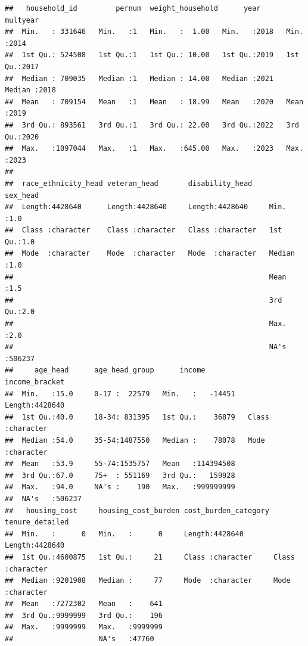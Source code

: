 \documentclass[
]{article}
\begin{document}
\begin{verbatim}
##   household_id         pernum  weight_household      year         multyear   
##  Min.   : 331646   Min.   :1   Min.   :  1.00   Min.   :2018   Min.   :2014  
##  1st Qu.: 524508   1st Qu.:1   1st Qu.: 10.00   1st Qu.:2019   1st Qu.:2017  
##  Median : 709035   Median :1   Median : 14.00   Median :2021   Median :2018  
##  Mean   : 709154   Mean   :1   Mean   : 18.99   Mean   :2020   Mean   :2019  
##  3rd Qu.: 893561   3rd Qu.:1   3rd Qu.: 22.00   3rd Qu.:2022   3rd Qu.:2020  
##  Max.   :1097044   Max.   :1   Max.   :645.00   Max.   :2023   Max.   :2023  
##                                                                              
##  race_ethnicity_head veteran_head       disability_head       sex_head     
##  Length:4428640      Length:4428640     Length:4428640     Min.   :1.0     
##  Class :character    Class :character   Class :character   1st Qu.:1.0     
##  Mode  :character    Mode  :character   Mode  :character   Median :1.0     
##                                                            Mean   :1.5     
##                                                            3rd Qu.:2.0     
##                                                            Max.   :2.0     
##                                                            NA's   :506237  
##     age_head      age_head_group      income          income_bracket    
##  Min.   :15.0     0-17 :  22579   Min.   :   -14451   Length:4428640    
##  1st Qu.:40.0     18-34: 831395   1st Qu.:    36879   Class :character  
##  Median :54.0     35-54:1487550   Median :    78078   Mode  :character  
##  Mean   :53.9     55-74:1535757   Mean   :114394508                     
##  3rd Qu.:67.0     75+  : 551169   3rd Qu.:   159928                     
##  Max.   :94.0     NA's :    190   Max.   :999999999                     
##  NA's   :506237                                                         
##   housing_cost     housing_cost_burden cost_burden_category tenure_detailed   
##  Min.   :      0   Min.   :      0     Length:4428640       Length:4428640    
##  1st Qu.:4600875   1st Qu.:     21     Class :character     Class :character  
##  Median :9201908   Median :     77     Mode  :character     Mode  :character  
##  Mean   :7272302   Mean   :    641                                            
##  3rd Qu.:9999999   3rd Qu.:    196                                            
##  Max.   :9999999   Max.   :9999999                                            
##                    NA's   :47760                                              

\end{verbatim}
\end{document}
